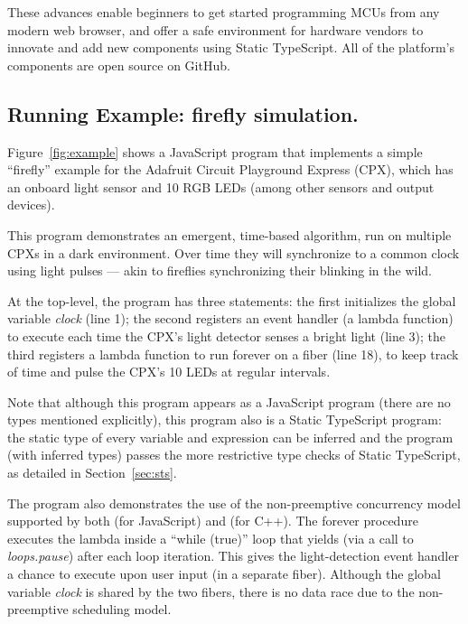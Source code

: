 These advances enable beginners to get started programming MCUs from any modern web browser, and offer a safe environment for hardware vendors to innovate and add new components using Static TypeScript. All of the platform's components are open source on GitHub.

\subsection{Running Example: firefly simulation.}

Figure~\ref{fig:example} shows a JavaScript
program that implements a simple ``firefly'' example
for the Adafruit Circuit Playground Express (CPX), which has an onboard light sensor and 10 RGB LEDs (among other sensors and output devices).

This program demonstrates an emergent, time-based algorithm, run on multiple CPXs in a dark environment. Over time they will synchronize to a common clock using light pulses --- akin to fireflies synchronizing their blinking in the wild.


At the top-level, the program has three statements:
the first initializes the global variable \emph{clock} (line 1); the
second registers an event handler (a lambda function) to execute
each time the CPX's light detector senses a bright light (line 3); the
third registers a lambda function to run forever on a fiber (line 18),
to keep track of time and pulse the CPX's 10 LEDs at regular intervals.

Note that although this program appears as a JavaScript program (there are no
types mentioned explicitly), this program also is a Static TypeScript program:
the static type of every variable and expression
can be inferred and the program (with inferred types) passes the more restrictive type checks
of Static TypeScript, as detailed in Section~\ref{sec:sts}.

The program also demonstrates the use of the non-preemptive concurrency
model supported by both \MC (for JavaScript) and \CO (for C++).
The forever procedure executes the lambda inside a ``while (true)''
loop that yields (via a call to \emph{loops.pause}) after each loop iteration.
This gives the light-detection event handler a chance to execute
upon user input (in a separate fiber). Although the global variable \emph{clock} is
shared by the two fibers, there is no data race due to the non-preemptive
scheduling model.

